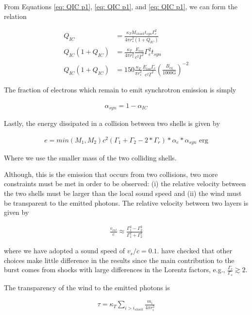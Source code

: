 \documentclass[linenumbers]{aastex631}
\begin{document}
From Equations \ref{eq: QIC p1}, \ref{eq: QIC p1}, and \ref{eq: QIC p1}, we can form the relation

\begin{align}
	Q_{IC} &= \frac{\kappa_T \dot{M}_{shock} t_{syn} \Gamma_e^2}{4\pi r_{*}^2 (1+Q_{IC})}\\ 
	Q_{IC}(1+Q_{IC}) &= \frac{\kappa_T}{4 \pi r_{*}^2} \frac{\dot{E}_{iso}}{c^2 \bar{\Gamma}^2} \Gamma_e^2 t_{syn}\\
	Q_{IC}(1+Q_{IC}) &= 150 \frac{\kappa_T}{\pi r_{*}^2} \frac{\dot{E}_{iso}\Gamma_e}{c^2 \bar{\Gamma}^2} \left(\frac{B_{eq}}{1000\text{G}}\right)^{-2}
\end{align}

The fraction of electrons which remain to emit synchrotron emission is simply 

\begin{align}
	\alpha_{syn} = 1 - \alpha_{IC}
\end{align}

Lastly, the energy dissipated in a collision between two shells is given by

\begin{align}
	e = min(M_1,M_2) c^2 (\Gamma_1 + \Gamma_2 - 2*\Gamma_r) * \alpha_e * \alpha_{syn} \text{ erg}
\end{align}

Where we use the smaller mass of the two colliding shells.

Although, this is the emission that occurs from two collisions, two more constraints must be met in order to be observed: (i) the relative velocity between the two shells must be larger than the local sound speed and (ii) the wind must be transparent to the emitted photons. The relative velocity between two layers is given by 

\begin{align}
	\frac{v_{rel}}{c} \approx \frac{\Gamma_1^2 - \Gamma_2^2}{\Gamma_1^2 + \Gamma_2^2}
\end{align}

where we have adopted a sound speed of $v_s/c = 0.1$. \citet{1998MNRAS.296..275D} have checked that other choices make little difference in the results since the main contribution to the burst comes from shocks with large differences in the Lorentz factors, e.g., $\frac{\Gamma_r}{\Gamma_s} \gtrsim 2$. 

The transparency of the wind to the emitted photons is 

\begin{align}
	\tau = \kappa_T \sum_{i>i_{shock}} \frac{m_i}{4\pi r_i^2}
\end{align}
\end{document}
